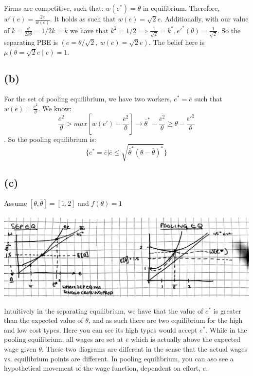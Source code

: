 \documentclass{article}
\begin{document}
Firms are competitive, such that: $w(e^*) = \theta$ in equilibrium. Therefore, $w'(e) = \frac{2e}{w(e)}$. It holds as such that $w(e) = \sqrt{2}e$. Additionally, with our value of $k = \frac{\theta}{2k\theta} = 1/2k = k$ we have that $k^2 = 1/2 \implies \frac{1}{\sqrt{2}} = k^*, e'^*(\theta) =  \frac{1}{\sqrt{2}}$. So the  separating PBE is $(e = \theta / \sqrt{2}, \ w(e) = \sqrt{2}e)$. The belief here is $\mu(\theta = \sqrt{2}e \mid e) = 1$.


\subsection*{(b)}
For the set of pooling equilibrium, we have two workers, $e^* = \overline{e}$ such that $w(\overline{e}) = \frac{\overline{e}^2}{\theta}$. We know: 
\[
\frac{\overline{e}^2}{\theta} > max[w(e') - \frac{\overline{e}^2}{\theta}] \rightarrow \overline{\theta}^* - \frac{\overline{e}^2}{\theta} \geq \theta - \frac{\overline{e}'^2}{\theta}
\]. So the pooling equilibrium is: 
\[
\{ e^* = \overline{e} | \overline{e} \leq \sqrt{\overline{\theta}^*(\theta - \overline{\theta})^*} \}
\]

\subsection*{(c)}

Assume $[\underline{\theta}, \overline{\theta}] = [1,2]$ and $f(\theta) = 1$
\begin{center}
    \includegraphics[width = .85\linewidth]{images/Screenshot 2025-03-22 at 20.52.48.png}
\end{center}

Intuitively in the separating equilibrium, we have that the value of $e^*$ is greater than the expected value of $\theta$, and as such there are two equilibrium for the high and low cost types. Here you can see its high types would accept $e^*$. While in the pooling equilibrium, all wages are set at $\overline{e}$ which is actually above the expected wage given $\theta$. These two diagrams are different in the sense that the actual wages vs. equilibrium points are different. In pooling equilibrium, you can aso see a hypothetical movement of the wage function, dependent on effort, $e$. 
\end{document}
